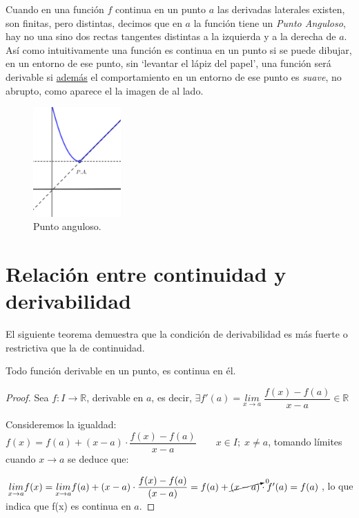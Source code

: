 	\begin{multicols}{2}
		
	Cuando en una función $f$ continua en un punto $a$ las derivadas laterales existen, son finitas, pero distintas, decimos que en $a$ la función tiene un 	\emph{Punto Anguloso}, hay no una sino dos rectas tangentes distintas a la izquierda y a la derecha de $a$. Así como intuitivamente una función es continua en un punto si se puede dibujar, en un entorno de ese punto, sin `levantar el lápiz del papel', una función será derivable si \underline{además} el comportamiento en un entorno de ese punto es \emph{suave}, no abrupto, como aparece el la imagen de al lado.
	
	\begin{figure}[H]
		\centering
		\includegraphics[width=0.3\textwidth]{imagenes/imagenes04/T04IM03.png}
		\caption {Punto anguloso.}
	\end{figure}
	
	\end{multicols}
	
	
	\section{Relación entre continuidad y derivabilidad}
	
	
	El siguiente teorema demuestra que la condición de derivabilidad es más fuerte o restrictiva que la de continuidad.
	
	\begin{teor}
	\label{teor:deriv-cont}
		Todo función derivable en un punto, es continua en él.
	\end{teor}

	\begin{proof}
		Sea $f:I\to \mathbb R$, derivable en $a$, es decir, $\exists f'(a)=\underset{x\to a}{lim}\;{\dfrac {f(x)-f(a)}{x-a}} \in \mathbb R$
		
		Consideremos la igualdad: $f(x)=f(a)+(x-a) \cdot \dfrac {f(x)-f(a)}{x-a} \qquad x\in I; \; x\neq a $, tomando límites cuando $x\to a$ se deduce que:
		
		$\underset {x\to a}{lim }{f(x)}= \underset {x\to a}{lim }{ f(a)+{(x-a)} \cdot \dfrac {f(x)-f(a)}{(x-a)} }=f(a)+\cancelto {0}{(x-a)} \cdot f'(a)= f(a)$, lo que indica que f(x) es continua en $a$.
		
	\end{proof}
	
